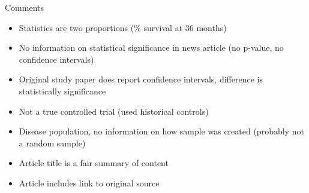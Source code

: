 \documentclass{beamer}
\begin{document}
\begin{frame}{Comments}
\begin{itemize}
\item Statistics are two proportions (\% survival at 36 months)
\item No information on statistical significance in news article (no p-value, no confidence intervals)
\item Original study paper does report confidence intervals, difference is statistically significance
\item Not a true controlled trial (used historical controls)
\item Disease population, no information on how sample was created (probably not a random sample)
\item Article title is a fair summary of content
\item Article includes link to original source
\end{itemize}
\end{frame}
\end{document}
